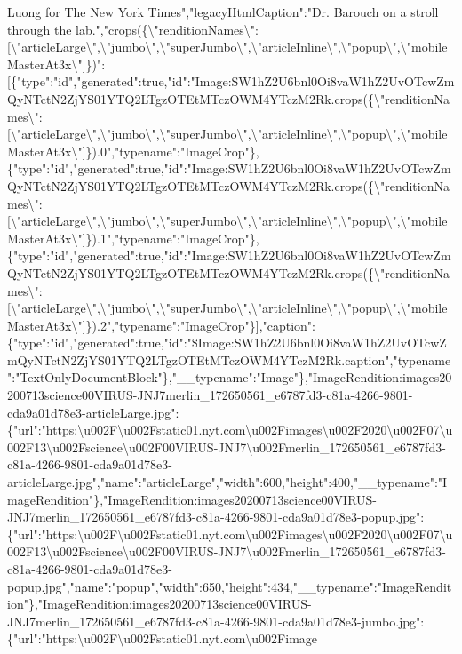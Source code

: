 Luong for The New York Times","legacyHtmlCaption":"Dr. Barouch on a
stroll through the
lab.","crops(\{\textbackslash{}"renditionNames\textbackslash{}":{[}\textbackslash{}"articleLarge\textbackslash{}",\textbackslash{}"jumbo\textbackslash{}",\textbackslash{}"superJumbo\textbackslash{}",\textbackslash{}"articleInline\textbackslash{}",\textbackslash{}"popup\textbackslash{}",\textbackslash{}"mobileMasterAt3x\textbackslash{}"{]}\})":{[}\{"type":"id","generated":true,"id":"Image:SW1hZ2U6bnl0Oi8vaW1hZ2UvOTcwZmQyNTctN2ZjYS01YTQ2LTgzOTEtMTczOWM4YTczM2Rk.crops(\{\textbackslash{}"renditionNames\textbackslash{}":{[}\textbackslash{}"articleLarge\textbackslash{}",\textbackslash{}"jumbo\textbackslash{}",\textbackslash{}"superJumbo\textbackslash{}",\textbackslash{}"articleInline\textbackslash{}",\textbackslash{}"popup\textbackslash{}",\textbackslash{}"mobileMasterAt3x\textbackslash{}"{]}\}).0","typename":"ImageCrop"\},\{"type":"id","generated":true,"id":"Image:SW1hZ2U6bnl0Oi8vaW1hZ2UvOTcwZmQyNTctN2ZjYS01YTQ2LTgzOTEtMTczOWM4YTczM2Rk.crops(\{\textbackslash{}"renditionNames\textbackslash{}":{[}\textbackslash{}"articleLarge\textbackslash{}",\textbackslash{}"jumbo\textbackslash{}",\textbackslash{}"superJumbo\textbackslash{}",\textbackslash{}"articleInline\textbackslash{}",\textbackslash{}"popup\textbackslash{}",\textbackslash{}"mobileMasterAt3x\textbackslash{}"{]}\}).1","typename":"ImageCrop"\},\{"type":"id","generated":true,"id":"Image:SW1hZ2U6bnl0Oi8vaW1hZ2UvOTcwZmQyNTctN2ZjYS01YTQ2LTgzOTEtMTczOWM4YTczM2Rk.crops(\{\textbackslash{}"renditionNames\textbackslash{}":{[}\textbackslash{}"articleLarge\textbackslash{}",\textbackslash{}"jumbo\textbackslash{}",\textbackslash{}"superJumbo\textbackslash{}",\textbackslash{}"articleInline\textbackslash{}",\textbackslash{}"popup\textbackslash{}",\textbackslash{}"mobileMasterAt3x\textbackslash{}"{]}\}).2","typename":"ImageCrop"\}{]},"caption":\{"type":"id","generated":true,"id":"\$Image:SW1hZ2U6bnl0Oi8vaW1hZ2UvOTcwZmQyNTctN2ZjYS01YTQ2LTgzOTEtMTczOWM4YTczM2Rk.caption","typename":"TextOnlyDocumentBlock"\},"\_\_typename":"Image"\},"ImageRendition:images20200713science00VIRUS-JNJ7merlin\_172650561\_e6787fd3-c81a-4266-9801-cda9a01d78e3-articleLarge.jpg":\{"url":"https:\textbackslash{}u002F\textbackslash{}u002Fstatic01.nyt.com\textbackslash{}u002Fimages\textbackslash{}u002F2020\textbackslash{}u002F07\textbackslash{}u002F13\textbackslash{}u002Fscience\textbackslash{}u002F00VIRUS-JNJ7\textbackslash{}u002Fmerlin\_172650561\_e6787fd3-c81a-4266-9801-cda9a01d78e3-articleLarge.jpg","name":"articleLarge","width":600,"height":400,"\_\_typename":"ImageRendition"\},"ImageRendition:images20200713science00VIRUS-JNJ7merlin\_172650561\_e6787fd3-c81a-4266-9801-cda9a01d78e3-popup.jpg":\{"url":"https:\textbackslash{}u002F\textbackslash{}u002Fstatic01.nyt.com\textbackslash{}u002Fimages\textbackslash{}u002F2020\textbackslash{}u002F07\textbackslash{}u002F13\textbackslash{}u002Fscience\textbackslash{}u002F00VIRUS-JNJ7\textbackslash{}u002Fmerlin\_172650561\_e6787fd3-c81a-4266-9801-cda9a01d78e3-popup.jpg","name":"popup","width":650,"height":434,"\_\_typename":"ImageRendition"\},"ImageRendition:images20200713science00VIRUS-JNJ7merlin\_172650561\_e6787fd3-c81a-4266-9801-cda9a01d78e3-jumbo.jpg":\{"url":"https:\textbackslash{}u002F\textbackslash{}u002Fstatic01.nyt.com\textbackslash{}u002Fimage